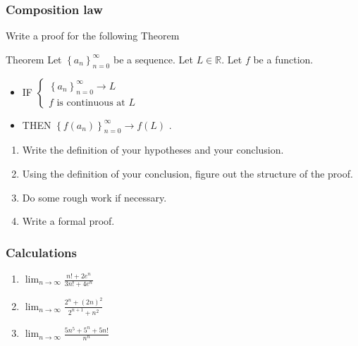 \begin{frame}[t]
	\fontsize{13}{13}\selectfont
	\frametitle{Composition law}
	Write a proof for the following Theorem
	\begin{block}{Theorem}
		Let $\displaystyle \left\{ a_{n} \right\}_{n=0}^{\infty}$ be a sequence. Let
		$\displaystyle L \in \mathbb{R}$. Let $f$ be a function.
		\begin{itemize}
			\item IF $\displaystyle
				\begin{cases}
					\left\{ a_{n} \right\}_{n=0}^{\infty}\longrightarrow L \\
					f \text{ is continuous at }L
				\end{cases}$

			\item THEN $\displaystyle \left\{ f(a_{n}) \right\}_{n=0}^{\infty}\longrightarrow
				f(L)$ .
		\end{itemize}
	\end{block}
	\begin{enumerate}
		\item Write the definition of your hypotheses and your conclusion.

		\item Using the definition of your conclusion, figure out the structure of
			the proof.

		\item Do some rough work if necessary.

		\item Write a formal proof.
	\end{enumerate}
\end{frame}

\begin{frame}[t]
	\frametitle{Calculations}

	\begin{enumerate}
		\item $\displaystyle \lim_{n \to \infty}\frac{n! + 2 e^{n}}{3n! + 4 e^{n}}$

			\vfill

		\item $\displaystyle \lim_{n \to \infty}\frac{2^{n}+ (2n)^{2}}{2^{n+1}+ n^{2}}$

			\vfill

		\item $\displaystyle \lim_{n \to \infty}\frac{5n^{5}+ 5^{n}+ 5n! }{n^{n}}$
	\end{enumerate}

	\vfill
\end{frame}

